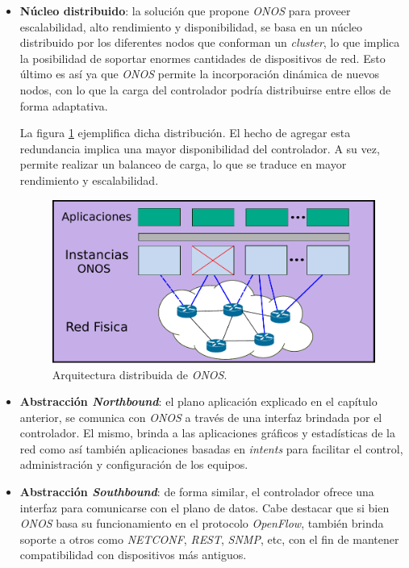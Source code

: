 \begin{itemize}
	\item \textbf{Núcleo distribuido}: la solución que propone \textit{ONOS} para proveer escalabilidad, alto rendimiento y disponibilidad, se basa en un núcleo distribuido por los diferentes nodos que conforman un \textit{cluster}, lo que implica la posibilidad de soportar enormes cantidades de dispositivos de red. Esto último es así ya que \textit{ONOS} permite la incorporación dinámica de nuevos nodos, con lo que la carga del controlador podría distribuirse entre ellos de forma adaptativa.
	
	La figura \ref{fig:onosdistribuido} ejemplifica dicha distribución. El hecho de agregar esta redundancia implica una mayor disponibilidad del controlador. A su vez, permite realizar un balanceo de carga, lo que se traduce en mayor rendimiento y escalabilidad.

	\begin{figure}[H]
		\centering
		\includegraphics[scale=0.7]{Figures/onosarch.pdf}
		\caption{Arquitectura distribuida de \textit{ONOS}.}
		\label{fig:onosdistribuido}
	  \end{figure}


	\item \textbf{Abstracción \textit{Northbound}}: el plano aplicación explicado en el capítulo anterior, se comunica con \textit{ONOS} a través de una interfaz brindada por el controlador. El mismo, brinda a las aplicaciones gráficos y estadísticas de la red como así también aplicaciones basadas en \textit{intents} para facilitar el control, administración y configuración de los equipos.
	\item \textbf{Abstracción \textit{Southbound}}: de forma similar, el controlador ofrece una interfaz para comunicarse con el plano de datos. Cabe destacar que si bien \textit{ONOS} basa su funcionamiento en el protocolo \textit{OpenFlow}, también brinda soporte a otros como \textit{NETCONF}, \textit{REST}, \textit{SNMP}, etc, con el fin de mantener compatibilidad con dispositivos más antiguos.
	

\end{itemize}
